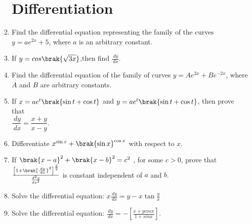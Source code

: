 \begin{enumerate}
\section*{Differentiation}

\item Find the differential equation representing the family of the curves\\
$y=ae^{2x}+5$, where $a$ is an arbitrary constant.

\item If $y=cos \brak{\sqrt{3x}}$,then find $\frac{\,dy}{\,dx}$.

\item Find the differential equation of the family of curves ${y} = Ae^{2x} + Be^{-2x}$, 
where $A$ and $B$ are arbitrary constants. 

\item If $ x = ae^{t}\brak{\sin t + \cos t}$ and $y = ae^{t}\brak{\sin t + \cos t}$,
then prove that \\
$\dfrac{\,dy}{\,dx} = \dfrac{x+y}{x-y}$.

\item Differentiate $ x^{\sin x} + \brak{\sin x}^{\cos x}$ with respect to $x$.

\item If $\brak{x-a}^2 + \brak{x-b}^2 = {c}^2$ , for some $c > 0$, prove that
$ \frac{\left[ 1 + \brak{\frac{\,dy}{\,dx}}^2 \right]^\frac{3}{2}}{\frac{d^2 y}{dx^2}} $ 
is constant independent of $a$ and $b$.

\item Solve the differential equation:
$x\frac{\,dy}{\,dx} = y - x\tan{\frac{y}{x}}$

\item Solve the differential equation:
$\frac{\,dy}{\,dx} =-\left[\frac{x + ycosx}{ 1 + sinx}\right]$.
\end{enumerate}